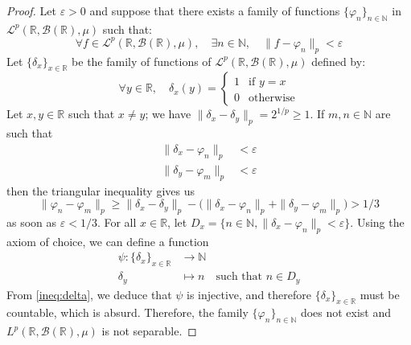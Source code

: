\documentclass[11pt,a4paper,twoside]{article}
\theoremstyle{definition}
\begin{document}
\begin{proof}
  Let $\varepsilon > 0$ and suppose that there exists a family of functions $\{ \varphi_n \}_{n \in \mathbb{N}}$
  in $\mathscr{L}^p ( \mathbb{R}, \mathscr{B} ( \mathbb{R} ), \mu )$ such that:
  \begin{equation*}
    \forall f \in \mathscr{L}^p ( \mathbb{R}, \mathscr{B} ( \mathbb{R} ), \mu ), \quad\exists n \in \mathbb{N}, \quad \| f - \varphi_n \|_p < \varepsilon
  \end{equation*}
  Let $\{ \delta_x \}_{x \in \mathbb{R}}$ be the family of functions of $\mathscr{L}^p ( \mathbb{R}, \mathscr{B} ( \mathbb{R} ), \mu )$ defined by:
  \begin{equation*}
    \forall y \in \mathbb{R}, \quad \delta_x ( y ) = \begin{cases}
      1 &\text{if } y = x \\
      0 &\text{otherwise}
    \end{cases}
  \end{equation*}
  Let $x, y \in \mathbb{R}$ such that $x \neq y$; we have $\| \delta_x - \delta_y \|_p = 2^{1 / p} \geq 1$. If $m, n \in \mathbb{N}$ are such that
  \begin{align*}
    \| \delta_x - \varphi_n \|_p &< \varepsilon \\
    \| \delta_y - \varphi_m \|_p &< \varepsilon
  \end{align*}
  then the triangular inequality gives us
  \begin{equation} \label{ineq:delta}
    \| \varphi_n - \varphi_m \|_p \geq \| \delta_x - \delta_y \|_p - \big( \| \delta_x - \varphi_n \|_p + \| \delta_y - \varphi_m \|_p \big) > 1 / 3
  \end{equation}
  as soon as $\varepsilon < 1 / 3$. For all $x \in \mathbb{R}$, let $D_x = \{ n \in \mathbb{N}, \| \delta_x - \varphi_n \|_p < \varepsilon \}$.
  Using the axiom of choice, we can define a function
  \begin{align*}
    \psi : \{ \delta_x \}_{x \in \mathbb{R}} &\to \mathbb{N} \\
    \delta_y &\mapsto n \quad\text{such that } n \in D_y
  \end{align*}
  From \eqref{ineq:delta}, we deduce that $\psi$ is injective, and therefore $\{ \delta_x \}_{x \in \mathbb{R}}$ must be countable, which is absurd.
  Therefore, the family $\{ \varphi_n \}_{n \in \mathbb{N}}$ does not exist and $L^p ( \mathbb{R}, \mathscr{B} ( \mathbb{R} ), \mu )$ is not separable.

\end{proof}
\end{document}
